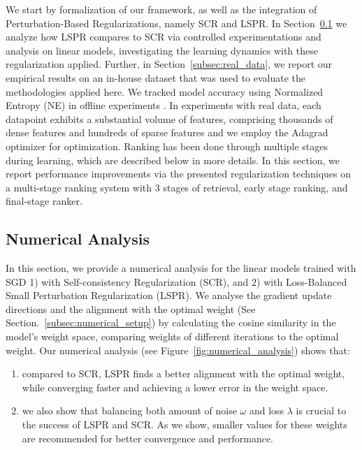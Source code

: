 We start by formalization of our framework, as well as the integration of Perturbation-Based Regularizations, namely SCR and LSPR. 
In Section~\ref{subsec:numerical_analysis} we analyze how LSPR compares to SCR via controlled experimentations and analysis on linear models, investigating the learning dynamics with these regularization applied.
Further, in Section~\ref{subsec:real_data}, we report our empirical results on an in-house dataset that was used to evaluate the methodologies applied here. 
We tracked model accuracy using Normalized Entropy (NE) in offline experiments \cite{he2014practical}.
In experiments with real data, each datapoint exhibits a substantial volume of features, comprising thousands of dense features and hundreds of sparse features and we employ the Adagrad optimizer for optimization.
Ranking has been done through multiple stages during learning, which are described below in more details.
In this section, we report performance improvements via the presented regularization techniques on a multi-stage ranking system with 3 stages of retrieval, early stage ranking, and final-stage ranker.


\subsection{Numerical Analysis}
\label{subsec:numerical_analysis}

In this section, we provide a numerical analysis for the linear models trained with SGD 1) with Self-consistency Regularization (SCR), and 2) with Loss-Balanced Small Perturbation Regularization (LSPR).
We analyse the gradient update directions and the alignment with the optimal weight (See Section.~\ref{subsec:numerical_setup}) by calculating the cosine similarity in the model's weight space, comparing weights of different iterations to the optimal weight.
Our numerical analysis (see Figure~\ref{fig:numerical_analysis}) shows that: 
\begin{enumerate}
    \item compared to SCR, LSPR finds a better alignment with the optimal weight, while converging faster and achieving a lower error in the weight space. 
    \item we also show that balancing both amount of noise $\omega$ and loss $\lambda$ is crucial to the success of LSPR and SCR. As we show, smaller values for these weights are recommended for better convergence and performance.
\end{enumerate} 


